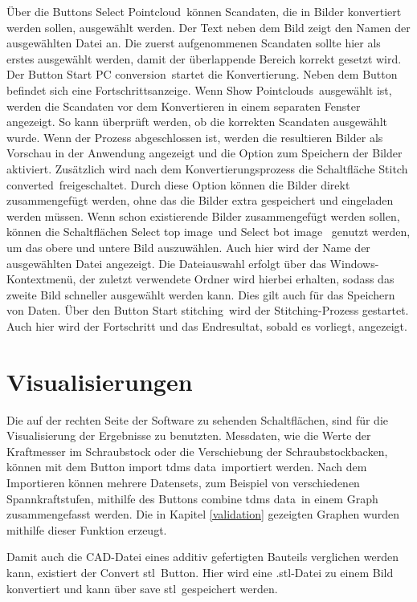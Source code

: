 Über die Buttons \glqq Select Pointcloud\grqq~können Scandaten, 
die in Bilder konvertiert werden sollen, ausgewählt werden.
Der Text neben dem Bild zeigt den Namen der ausgewählten 
Datei an. Die zuerst aufgenommenen Scandaten sollte hier als erstes ausgewählt werden, 
damit der überlappende Bereich korrekt gesetzt wird.
Der Button \glqq Start PC conversion\grqq~startet die Konvertierung. Neben dem Button 
befindet sich eine Fortschrittsanzeige.
Wenn \glqq Show Pointclouds\grqq~ausgewählt ist, werden die Scandaten vor dem 
Konvertieren in einem separaten Fenster angezeigt. So kann überprüft werden, ob die 
korrekten Scandaten ausgewählt wurde.
Wenn der Prozess abgeschlossen ist, werden die resultieren Bilder als Vorschau in der 
Anwendung angezeigt und die Option zum Speichern der Bilder aktiviert.
Zusätzlich wird nach dem Konvertierungsprozess die Schaltfläche 
\glqq Stitch converted\grqq~freigeschaltet. Durch diese Option können die 
Bilder direkt zusammengefügt werden, ohne das die Bilder extra gespeichert und 
eingeladen werden müssen. Wenn schon existierende Bilder zusammengefügt werden sollen, 
können die Schaltflächen \glqq Select top image\grqq~und \glqq Select bot image\grqq~
genutzt werden, um das obere und untere Bild auszuwählen. Auch hier wird der Name der 
ausgewählten Datei angezeigt. Die Dateiauswahl erfolgt über das 
Windows-Kontextmenü, der zuletzt verwendete Ordner wird hierbei erhalten, sodass das 
zweite Bild schneller ausgewählt werden kann. Dies gilt auch für das Speichern von Daten.
Über den Button \glqq Start stitching\grqq~wird der Stitching-Prozess gestartet. 
Auch hier wird der Fortschritt und das Endresultat, sobald es vorliegt, angezeigt.

\section{Visualisierungen}

Die auf der rechten Seite der Software zu sehenden Schaltflächen, sind für die 
Visualisierung der Ergebnisse zu benutzten. 
Messdaten, wie die Werte der Kraftmesser im Schraubstock oder die Verschiebung der 
Schraubstockbacken, können 
mit dem Button \glqq import tdms data\grqq~importiert werden. Nach dem Importieren 
können mehrere Datensets, zum Beispiel von verschiedenen Spannkraftstufen, mithilfe 
des Buttons \glqq combine tdms data\grqq~in einem Graph zusammengefasst werden.
Die in Kapitel \ref{validation} gezeigten Graphen wurden mithilfe dieser Funktion erzeugt.

Damit auch die CAD-Datei eines additiv gefertigten Bauteils verglichen werden kann, 
existiert der \glqq Convert stl\grqq~Button. Hier wird eine .stl-Datei zu einem Bild 
konvertiert und kann über \glqq save stl\grqq~gespeichert werden.


